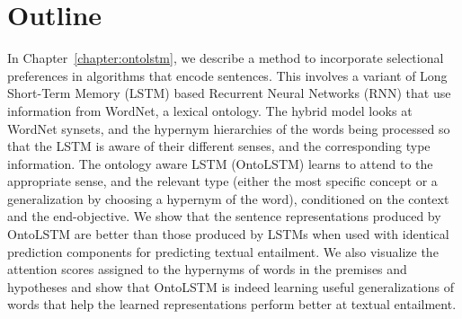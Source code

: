 \section{Outline}

In Chapter~\ref{chapter:ontolstm}, we describe a method to incorporate selectional 
preferences in algorithms that encode sentences. This involves a variant of Long Short-Term
Memory (LSTM) based Recurrent Neural Networks (RNN) that use information
from WordNet, a lexical 
ontology. The hybrid model looks at WordNet synsets, and the hypernym hierarchies of the
words being processed so that the 
LSTM is aware of their different senses, and the corresponding type information.
The ontology aware LSTM (OntoLSTM) learns to attend to the appropriate sense,
and the relevant type 
(either the most specific concept or a generalization by choosing a hypernym of
the word), conditioned on the context and the end-objective. We show that the sentence representations 
produced by OntoLSTM are better than those produced by LSTMs when used with identical prediction 
components for predicting textual entailment. We also visualize the attention scores assigned to the hypernyms 
of words in the premises and hypotheses and show that OntoLSTM is indeed learning useful generalizations of words
that help the learned representations perform better at textual entailment.

